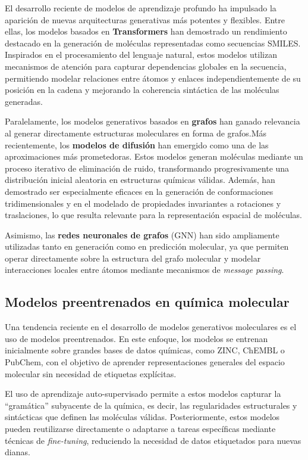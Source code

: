 \documentclass[IB]{TFUOC}%
\begin{document}
El desarrollo reciente de modelos de aprendizaje profundo ha impulsado la aparición de nuevas arquitecturas generativas más potentes y flexibles. Entre ellas, los modelos basados en \textbf{Transformers }han demostrado un rendimiento destacado en la generación de moléculas representadas como secuencias SMILES. Inspirados en el procesamiento del lenguaje natural, estos modelos utilizan mecanismos de atención para capturar dependencias globales en la secuencia, permitiendo modelar relaciones entre átomos y enlaces independientemente de su posición en la cadena y mejorando la coherencia sintáctica de las moléculas generadas.

Paralelamente, los modelos generativos basados en \textbf{grafos} han ganado relevancia al generar directamente estructuras moleculares en forma de grafos.Más recientemente, los \textbf{modelos de difusión} han emergido como una de las aproximaciones más prometedoras. Estos modelos generan moléculas mediante un proceso iterativo de eliminación de ruido, transformando progresivamente una distribución inicial aleatoria en estructuras químicas válidas. Además, han demostrado ser especialmente eficaces en la generación de conformaciones tridimensionales y en el modelado de propiedades invariantes a rotaciones y traslaciones, lo que resulta relevante para la representación espacial de moléculas.

Asimismo, las \textbf{redes neuronales de grafos} (GNN) han sido ampliamente utilizadas tanto en generación como en predicción molecular, ya que permiten operar directamente sobre la estructura del grafo molecular y modelar interacciones locales entre átomos mediante mecanismos de \textit{message passing}.

\subsection{Modelos preentrenados en química molecular}

Una tendencia reciente en el desarrollo de modelos generativos moleculares es el uso de modelos preentrenados. En este enfoque, los modelos se entrenan inicialmente sobre grandes bases de datos químicas, como ZINC, ChEMBL o PubChem, con el objetivo de aprender representaciones generales del espacio molecular sin necesidad de etiquetas explícitas.

El uso de aprendizaje auto-supervisado permite a estos modelos capturar la ``gramática'' subyacente de la química, es decir, las regularidades estructurales y sintácticas que definen las moléculas válidas. Posteriormente, estos modelos pueden reutilizarse directamente o adaptarse a tareas específicas mediante técnicas de \textit{fine-tuning}, reduciendo la necesidad de datos etiquetados para nuevas dianas.
\end{document}
